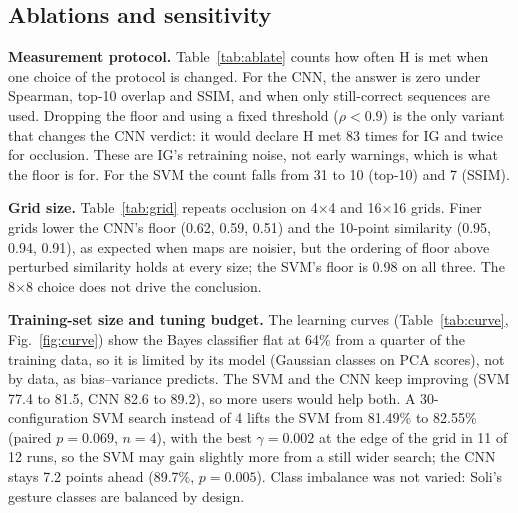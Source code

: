 \documentclass[11pt]{article}
\begin{document}
\subsection{Ablations and sensitivity}
\textbf{Measurement protocol.} Table~\ref{tab:ablate} counts how often H is met when one choice of the protocol is changed. For the CNN, the answer is zero under Spearman, top-10 overlap and SSIM, and when only still-correct sequences are used. Dropping the floor and using a fixed threshold ($\rho<0.9$) is the only variant that changes the CNN verdict: it would declare H met 83 times for IG and twice for occlusion. These are IG's retraining noise, not early warnings, which is what the floor is for. For the SVM the count falls from 31 to 10 (top-10) and 7 (SSIM).

\begin{table}[!tb]
\centering
\small

\caption{Cases (of 600 per map) in which H is met under each variant of the measurement protocol.}
\label{tab:ablate}
\end{table}

\textbf{Grid size.} Table~\ref{tab:grid} repeats occlusion on 4$\times$4 and 16$\times$16 grids. Finer grids lower the CNN's floor (0.62, 0.59, 0.51) and the 10-point similarity (0.95, 0.94, 0.91), as expected when maps are noisier, but the ordering of floor above perturbed similarity holds at every size; the SVM's floor is 0.98 on all three. The 8$\times$8 choice does not drive the conclusion.

\begin{table}[!tb]
\centering
\small

\caption{Sensitivity to the attribution grid (occlusion). The last column averages over the five perturbations at the 10-point strength; the SVM average includes the 51--55-point drops.}
\label{tab:grid}
\end{table}

\textbf{Training-set size and tuning budget.} The learning curves (Table~\ref{tab:curve}, Fig.~\ref{fig:curve}) show the Bayes classifier flat at 64\% from a quarter of the training data, so it is limited by its model (Gaussian classes on PCA scores), not by data, as bias--variance predicts. The SVM and the CNN keep improving (SVM 77.4 to 81.5, CNN 82.6 to 89.2), so more users would help both. A 30-configuration SVM search instead of 4 lifts the SVM from 81.49\% to 82.55\% (paired $p=0.069$, $n=4$), with the best $\gamma=0.002$ at the edge of the grid in 11 of 12 runs, so the SVM may gain slightly more from a still wider search; the CNN stays 7.2 points ahead (89.7\%, $p=0.005$). Class imbalance was not varied: Soli's gesture classes are balanced by design.
\end{document}
